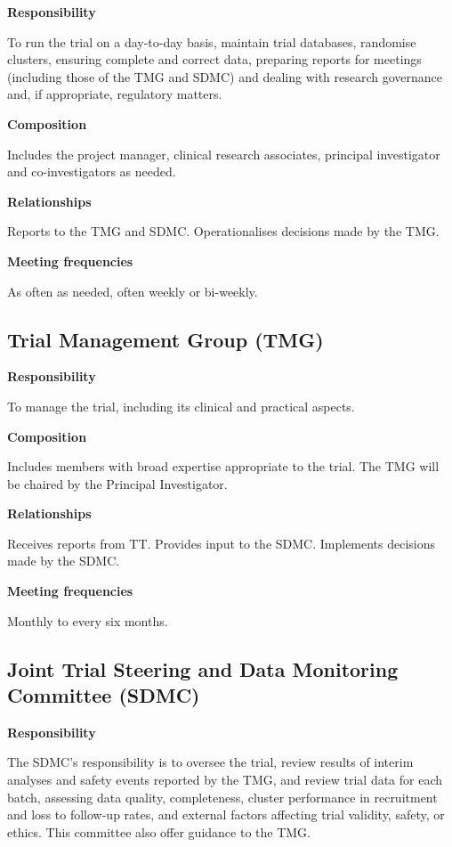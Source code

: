 \documentclass[
]{scrartcl}
\begin{document}
\textbf{Responsibility}

To run the trial on a day-to-day basis, maintain trial databases,
randomise clusters, ensuring complete and correct data, preparing
reports for meetings (including those of the TMG and SDMC) and dealing
with research governance and, if appropriate, regulatory matters.

\textbf{Composition}

Includes the project manager, clinical research associates, principal
investigator and co-investigators as needed.

\textbf{Relationships}

Reports to the TMG and SDMC. Operationalises decisions made by the TMG.

\textbf{Meeting frequencies}

As often as needed, often weekly or bi-weekly.

\hypertarget{trial-management-group-tmg}{%
\subsection{Trial Management Group
(TMG)}\label{trial-management-group-tmg}}

\textbf{Responsibility}

To manage the trial, including its clinical and practical aspects.

\textbf{Composition}

Includes members with broad expertise appropriate to the trial. The TMG
will be chaired by the Principal Investigator.

\textbf{Relationships}

Receives reports from TT. Provides input to the SDMC. Implements
decisions made by the SDMC.

\textbf{Meeting frequencies}

Monthly to every six months.

\hypertarget{joint-trial-steering-and-data-monitoring-committee-sdmc}{%
\subsection{Joint Trial Steering and Data Monitoring Committee
(SDMC)}\label{joint-trial-steering-and-data-monitoring-committee-sdmc}}

\textbf{Responsibility}

The SDMC's responsibility is to oversee the trial, review results of
interim analyses and safety events reported by the TMG, and review trial
data for each batch, assessing data quality, completeness, cluster
performance in recruitment and loss to follow-up rates, and external
factors affecting trial validity, safety, or ethics. This committee also
offer guidance to the TMG.
\end{document}
